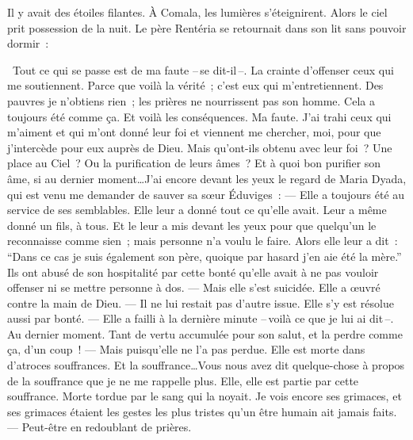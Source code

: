   Il y avait des étoiles filantes. À Comala, les lumières s'éteignirent.
\pend
%
\pstart
  Alors le ciel prit possession de la nuit.
\pend
%
\pstart
  Le père Rentéria se retournait dans son lit sans pouvoir dormir :

  \og{} Tout ce qui se passe est de ma faute --\,se dit-il\,--. La crainte d’offenser ceux qui me soutiennent. Parce que voilà la vérité ; c'est eux qui m’entretiennent. Des pauvres je n’obtiens rien ; les prières ne nourrissent pas son homme. Cela a toujours été comme ça. Et voilà les conséquences. Ma faute. J’ai trahi ceux qui m’aiment et qui m’ont donné leur foi et viennent me chercher, moi, pour que j’intercède pour eux auprès de Dieu. Mais qu’ont-ils obtenu avec leur foi ? Une place au Ciel ? Ou la purification de leurs âmes ? Et à quoi bon purifier son âme, si au dernier moment\ldots J’ai encore devant les yeux le regard de Maria Dyada, qui est venu me demander de sauver sa sœur Éduviges :
\pend
%
\pstart
  \guillemotright --- Elle a toujours été au service de ses semblables. Elle leur a donné tout ce qu’elle avait. Leur a même donné un fils, à tous. Et le leur a mis devant les yeux pour que quelqu’un le reconnaisse comme sien ; mais personne n’a voulu le faire. Alors elle leur a dit : ``Dans ce cas je suis également son père, quoique par hasard j’en aie été la mère.'' Ils ont abusé de son hospitalité par cette bonté qu’elle avait à ne pas vouloir offenser ni se mettre personne à dos.
\pend
%
\pstart
  \guillemotright --- Mais elle s’est suicidée. Elle a œuvré contre la main de Dieu.
\pend
%
\pstart
  \guillemotright --- Il ne lui restait pas d’autre issue. Elle s’y est résolue aussi par bonté.
\pend
%
\pstart
  \guillemotright --- Elle a failli à la dernière minute --\,voilà ce que je lui ai dit\,--. Au dernier moment. Tant de vertu accumulée pour son salut, et la perdre comme ça, d'un coup !
\pend
%
\pstart
  \guillemotright --- Mais puisqu’elle ne l’a pas perdue. Elle est morte dans d’atroces souffrances. Et la souffrance\ldots Vous nous avez dit quelque-chose à propos de la souffrance que je ne me rappelle plus. Elle, elle est partie par cette souffrance. Morte tordue par le sang qui la noyait. Je vois encore ses grimaces, et ses grimaces étaient les gestes les plus tristes qu’un être humain ait jamais faits.
\pend
%
\pstart
  \guillemotright --- Peut-être en redoublant de prières.
